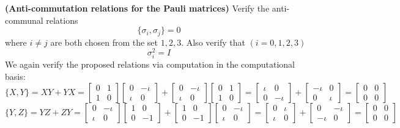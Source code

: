 \begin{example}
    \textbf{(Anti-commutation relations for the Pauli matrices)} Verify the anti-communal relations
    \[
    \{\sigma_i,\sigma_j\}=0
    \]
    where $i\neq j$ are both chosen from the set $1,2,3$. Also verify that $(i=0,1,2,3)$
    \[
    \sigma_i^2=I
    \]
    We again verify the proposed relations via computation in the computational basis:
    \[
    \{X,Y\}=XY+YX=\begin{bmatrix} 0 & 1 \\ 1 & 0 \end{bmatrix}\begin{bmatrix} 0 & -\iota  \\ \iota & 0 \end{bmatrix}+\begin{bmatrix} 0 & -\iota  \\ \iota & 0 \end{bmatrix}\begin{bmatrix} 0 & 1 \\ 1 & 0 \end{bmatrix}=\begin{bmatrix} \iota & 0 \\ 0 & -\iota \end{bmatrix}+\begin{bmatrix} -\iota & 0 \\ 0 & \iota \end{bmatrix} = \begin{bmatrix} 0 & 0 \\ 0 & 0 \end{bmatrix}
    \]
    \[
    \{Y,Z\}=YZ+ZY=\begin{bmatrix} 0 & -\iota  \\ \iota & 0 \end{bmatrix}\begin{bmatrix} 1 & 0 \\ 0 & -1 \end{bmatrix}+\begin{bmatrix} 1 & 0 \\ 0 & -1 \end{bmatrix}\begin{bmatrix} 0 & -\iota  \\ \iota & 0 \end{bmatrix}=\begin{bmatrix} 0 & \iota \\ \iota & 0 \end{bmatrix}+\begin{bmatrix} 0 & -\iota \\ -\iota & 0 \end{bmatrix} = \begin{bmatrix} 0 & 0 \\ 0 & 0 \end{bmatrix}
\]
\end{example}
